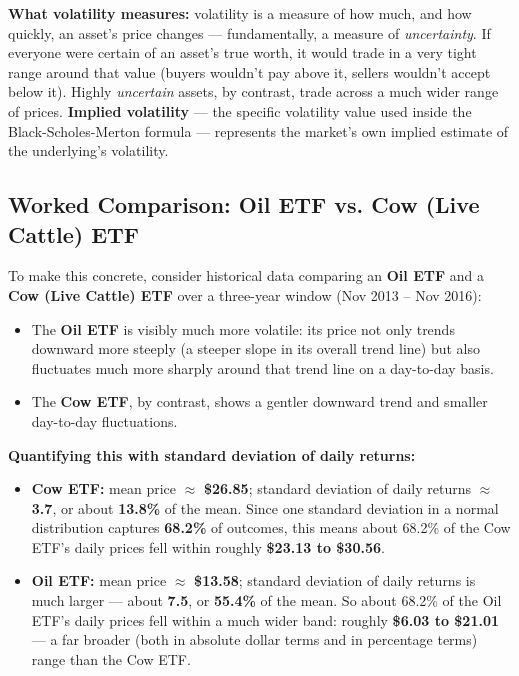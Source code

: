 \documentclass[12pt,openany]{book}
\theoremstyle{definition}
\theoremstyle{remark}
\begin{document}
\textbf{What volatility measures:} volatility is a measure of how much, and how quickly, an asset's price changes --- fundamentally, a measure of \emph{uncertainty}. If everyone were certain of an asset's true worth, it would trade in a very tight range around that value (buyers wouldn't pay above it, sellers wouldn't accept below it). Highly \emph{uncertain} assets, by contrast, trade across a much wider range of prices. \textbf{Implied volatility} --- the specific volatility value used inside the Black-Scholes-Merton formula --- represents the market's own implied estimate of the underlying's volatility.

\subsection{Worked Comparison: Oil ETF vs. Cow (Live Cattle) ETF}

To make this concrete, consider historical data comparing an \textbf{Oil ETF} and a \textbf{Cow (Live Cattle) ETF} over a three-year window (Nov 2013 -- Nov 2016):

\begin{itemize}
\item The \textbf{Oil ETF} is visibly much more volatile: its price not only trends downward more steeply (a steeper slope in its overall trend line) but also fluctuates much more sharply around that trend line on a day-to-day basis.


\item The \textbf{Cow ETF}, by contrast, shows a gentler downward trend and smaller day-to-day fluctuations.


\end{itemize}

\textbf{Quantifying this with standard deviation of daily returns:}

\begin{itemize}
\item \textbf{Cow ETF:} mean price \(\approx\) \textbf{\$26.85}; standard deviation of daily returns \(\approx\) \textbf{3.7}, or about \textbf{13.8\%} of the mean. Since one standard deviation in a normal distribution captures \textbf{68.2\%} of outcomes, this means about 68.2\% of the Cow ETF's daily prices fell within roughly \textbf{\$23.13 to \$30.56}.


\item \textbf{Oil ETF:} mean price \(\approx\) \textbf{\$13.58}; standard deviation of daily returns is much larger --- about \textbf{7.5}, or \textbf{55.4\%} of the mean. So about 68.2\% of the Oil ETF's daily prices fell within a much wider band: roughly \textbf{\$6.03 to \$21.01} --- a far broader (both in absolute dollar terms and in percentage terms) range than the Cow ETF.


\end{itemize}
\end{document}
